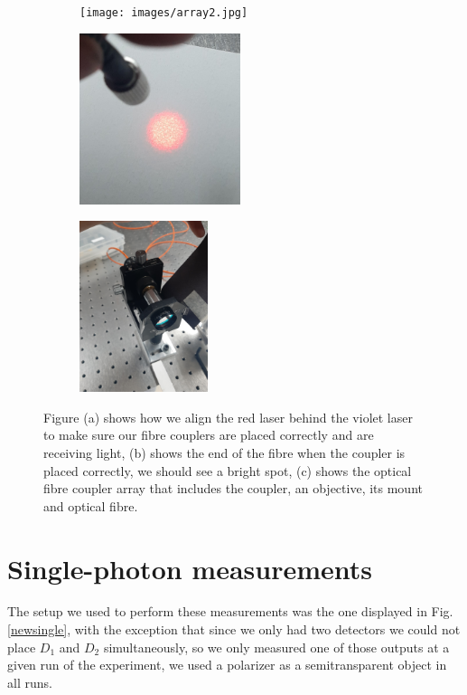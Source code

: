 \documentclass[12pt]{book}
\begin{document}
\begin{figure}[t!]
\centering
\begin{subfigure}[b]{0.3\linewidth}
\texttt{[image: images/array2.jpg]}
\caption{}
\end{subfigure}
\begin{subfigure}[b]{0.3\linewidth}
\includegraphics[width=\linewidth,height=5cm]{images/outfibre.jpg}
\caption{}
\end{subfigure}
\begin{subfigure}[b]{0.3\linewidth}
\includegraphics[width=\linewidth,height=5cm]{images/fibre.jpg}
\caption{}
\end{subfigure}
\caption{Figure (a) shows how we align the red laser behind the violet laser to make sure our fibre couplers are placed correctly and are receiving light, (b) shows the end of the fibre when the coupler is placed correctly, we should see a bright spot, (c) shows the optical fibre coupler array that includes the coupler, an objective, its mount and optical fibre.}
\label{fig:coupler}
\end{figure}


\section{Single-photon measurements}

The setup we used to perform these measurements was the one displayed in Fig. \ref{newsingle}, with the exception that since we only had two detectors we could not place $D_{1}$ and $D_{2}$ simultaneously, so we only measured one of those outputs at a given run of the experiment, we used a polarizer as a semitransparent object in all runs.
\end{document}
